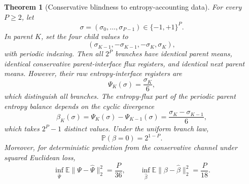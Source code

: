 \documentclass[a4paper,fleqn, sort&compress]{cas-sc}
\newtheorem{theorem}{Theorem}[section]
\theoremstyle{remark}
\theoremstyle{definition}
\begin{document}
\begin{theorem}[Conservative blindness to entropy-accounting data]
\label{thm:entropyblind}
For every \(P\ge2\), let
\[
  \sigma=(\sigma_0,\ldots,\sigma_{P-1})\in\{-1,+1\}^P.
\]
In parent \(K\), set the four child values to
\[
  (\sigma_{K-1},-\sigma_{K-1},-\sigma_K,\sigma_K),
\]
with periodic indexing.  Then all \(2^P\) branches have identical parent
means, identical conservative parent-interface flux registers, and identical
next parent means.  However, their raw entropy-interface registers are
\[
  \Psi_K(\sigma)=\frac{\sigma_K}{6},
\]
which distinguish all branches.  The entropy-flux part of the periodic
parent entropy balance depends on the cyclic divergence
\[
  \beta_K(\sigma)
  =
  \Psi_K(\sigma)-\Psi_{K-1}(\sigma)
  =
  \frac{\sigma_K-\sigma_{K-1}}{6},
\]
which takes \(2^P-1\) distinct values.  Under the uniform branch law,
\[
  \mathbb P(\beta=0)=2^{1-P}.
\]
Moreover, for deterministic prediction from the conservative channel under
squared Euclidean loss,
\[
  \inf_{\widehat\Psi}\mathbb E\|\Psi-\widehat\Psi\|_2^2
  =
  \frac{P}{36},
  \qquad
  \inf_{\widehat\beta}\mathbb E\|\beta-\widehat\beta\|_2^2
  =
  \frac{P}{18}.
\]
\end{theorem}
\end{document}
